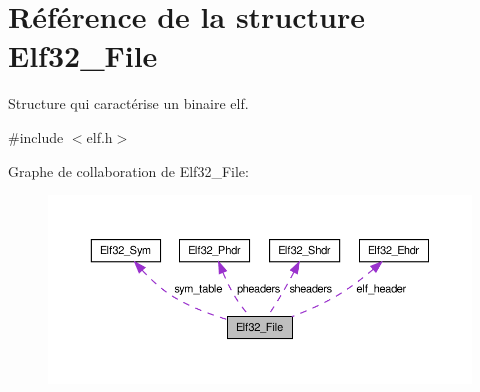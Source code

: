 \hypertarget{structElf32__File}{\section{Référence de la structure Elf32\+\_\+\+File}
\label{structElf32__File}
}


Structure qui caractérise un binaire elf.  




{\ttfamily \#include $<$elf.\+h$>$}



Graphe de collaboration de Elf32\+\_\+\+File\+:\nopagebreak
\begin{figure}[H]
\begin{center}
\leavevmode
\includegraphics[width=350pt]{structElf32__File__coll__graph}
\end{center}
\end{figure}
